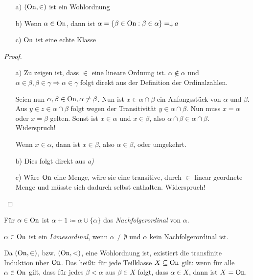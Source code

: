 \begin{satz}
	\begin{itemize}
		\item[a)] $(\operatorname{On},\in)$ ist ein Wohlordnung
		\item[b)] Wenn $\alpha\in \operatorname{On}$, dann ist $\alpha=\{\beta\in \operatorname{On}:\beta\in\alpha\}=\downarrow a$
		\item[c)] $\operatorname{On}$ ist eine echte Klasse
	\end{itemize}
\end{satz}
\begin{proof}
	\begin{itemize}
		\item[a)] Zu zeigen ist, dass $\in$ eine lineare Ordnung ist. $\alpha \notin \alpha$ und $\alpha\in\beta, \beta\in \gamma\Rightarrow \alpha\in\gamma$ folgt direkt aus der Definition der Ordinalzahlen.
		
		Seien nun $\alpha,\beta\in \operatorname{On}, \alpha\neq\beta$. Nun ist $x\in\alpha\cap\beta$ ein Anfangsstück von $\alpha$ und $\beta$. 
		Aus $y\in z \in \alpha\cap \beta$ folgt wegen der Transitivität $y\in\alpha\cap \beta$. Nun muss $x=\alpha$ oder $x=\beta$ gelten. Sonst ist $x\in \alpha$ und $x\in\beta$, also $\alpha\cap\beta \in \alpha\cap\beta$. Widerspruch!
		
		Wenn $x\in\alpha$, dann ist $x\in\beta$, also $\alpha \in \beta$, oder umgekehrt.
		
		\item[b)] Dies folgt direkt aus \textit{a)}
		
		\item[c)] Wäre $\operatorname{On}$ eine Menge, wäre sie eine transitive, durch $\in$ linear geordnete Menge und müsste sich dadurch selbst enthalten. Widerspruch!
	\end{itemize}
\end{proof}

\begin{definition}[Nachfolgerordinal]
	Für $\alpha\in \operatorname{On}$ ist $\alpha+1\coloneqq\alpha\cup \{\alpha\}$ das \textit{Nachfolgerordinal} von $\alpha$.
\end{definition}

\begin{definition}[Limesordinal]
	$\alpha\in \operatorname{On}$ ist ein \textit{Limesordinal}, wenn $\alpha\neq\emptyset$ und $\alpha$ kein Nachfolgerordinal ist.
\end{definition}

Da $(\operatorname{On},\in)$, bzw. $(\operatorname{On},<)$, eine Wohlordnung ist, existiert die transfinite Induktion über $\operatorname{On}$. Das heißt: für jede Teilklasse $X\subseteq \operatorname{On}$ gilt: wenn für alle $\alpha\in \operatorname{On}$ gilt, dass für jedes $\beta<\alpha$ aus $\beta\in X$ folgt, dass $\alpha\in X$, dann ist $X=\operatorname{On}$.

